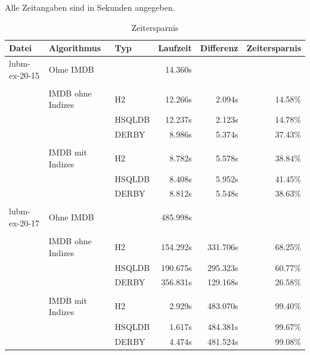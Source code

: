 \documentclass[draft,final]{vutinfth} %
\begin{document}
Alle Zeitangaben sind in Sekunden angegeben.

\begin{table}[]
\caption{Zeitersparnis}
\label{zeit}
\begin{tabular}{@{}lllrrr@{}}
\toprule
Datei         & Algorithmus       & Typ    & Laufzeit & Differenz & Zeitersparnis \\ \midrule
lubm-ex-20-15 & Ohne IMDB         &        & 14.360s  &           &               \\
              &                   &        &          &           &               \\
              & IMDB ohne Indizes & H2     & 12.266s  & 2.094s    & 14.58\%       \\
              &                   & HSQLDB & 12.237s  & 2.123s    & 14.78\%       \\
              &                   & DERBY  & 8.986s   & 5.374s    & 37.43\%       \\
              &                   &        &          &           &               \\
              & IMDB mit Indizes  & H2     & 8.782s   & 5.578s    & 38.84\%       \\
              &                   & HSQLDB & 8.408s   & 5.952s    & 41.45\%       \\
              &                   & DERBY  & 8.812s   & 5.548s    & 38.63\%       \\
              &                   &        &          &           &               \\
lubm-ex-20-17 & Ohne IMDB         &        & 485.998s &           &               \\
              &                   &        &          &           &               \\
              & IMDB ohne Indizes & H2     & 154.292s & 331.706s  & 68.25\%       \\
              &                   & HSQLDB & 190.675s & 295.323s  & 60.77\%       \\
              &                   & DERBY  & 356.831s & 129.168s  & 26.58\%       \\
              &                   &        &          &           &               \\
              & IMDB mit Indizes  & H2     & 2.929s   & 483.070s  & 99.40\%       \\
              &                   & HSQLDB & 1.617s   & 484.381s  & 99.67\%       \\
              &                   & DERBY  & 4.474s   & 481.524s  & 99.08\%       \\ \bottomrule
\end{tabular}
\end{table}
\end{document}
